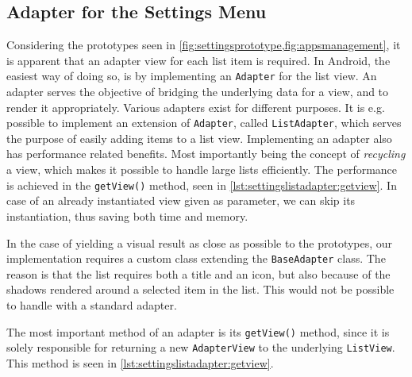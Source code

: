 \subsection{Adapter for the Settings Menu}\label{sec:settingslistadapter}
Considering the prototypes seen in \cref{fig:settingsprototype,fig:appsmanagement}, it is apparent that an adapter view for each list item is required.
In Android, the easiest way of doing so, is by implementing an \lstinline|Adapter| for the list view.
An adapter serves the objective of bridging the underlying data for a view, and to render it appropriately.
Various adapters exist for different purposes.
It is e.g. possible to implement an extension of \lstinline|Adapter|, called \lstinline|ListAdapter|, which serves the purpose of easily adding items to a list view.
Implementing an adapter also has performance related benefits.
Most importantly being the concept of \textit{recycling} a view, which makes it possible to handle large lists efficiently\cite{listViewsPerformance}. 
The performance is achieved in the \lstinline|getView()| method, seen in \cref{lst:settingslistadapter:getview}.
In case of an already instantiated view given as parameter, we can skip its instantiation, thus saving both time and memory.

In the case of yielding a visual result as close as possible to the prototypes, our implementation requires a custom class extending the \lstinline|BaseAdapter| class.
The reason is that the list requires both a title and an icon, but also because of the shadows rendered around a selected item in the list.
This would not be possible to handle with a standard adapter.

The most important method of an adapter is its \lstinline|getView()| method, since it is solely responsible for returning a new \lstinline|AdapterView| to the underlying \lstinline|ListView|.
This method is seen in \cref{lst:settingslistadapter:getview}.

